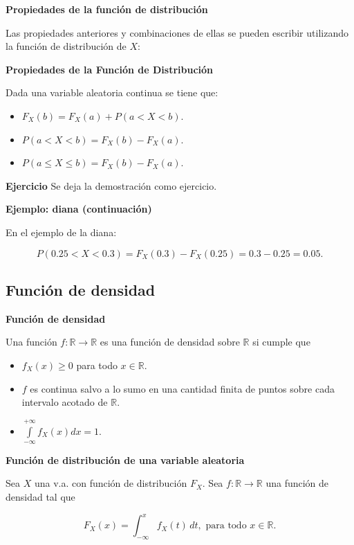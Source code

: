 \documentclass[]{book}
\providecommand{\tightlist}{%
  \setlength{\itemsep}{0pt}\setlength{\parskip}{0pt}}
\begin{document}
\textbf{Propiedades de la función de distribución}

Las propiedades anteriores y combinaciones de ellas se pueden
escribir utilizando la función de distribución de \(X\):

\textbf{Propiedades de la Función de Distribución}

Dada una variable aleatoria continua se tiene que:

\begin{itemize}
\tightlist
\item
  \(F_{X}(b)=F_{X}(a)+P(a<X<b)\).
\item
  \(P(a<X<b)=F_{X}(b)-F_{X}(a)\).
\item
  \(P(a\leq X\leq b)=F_{X}(b)-F_{X}(a)\).
\end{itemize}

\textbf{Ejercicio}
Se deja la demostración como ejercicio.

\textbf{Ejemplo: diana (continuación)}

En el ejemplo de la diana:

\[P(0.25<X<0.3)=F_{X}(0.3)-F_{X}(0.25)=0.3-0.25=0.05.\]

\hypertarget{funciuxf3n-de-densidad}{%
\subsection{Función de densidad}\label{funciuxf3n-de-densidad}}

\textbf{Función de densidad}

Una función \(f:\mathbb{R}\to\mathbb{R}\) es una función de densidad sobre \(\mathbb{R}\) si cumple que

\begin{itemize}
\tightlist
\item
  \(f_{X}(x)\geq 0\) para todo \(x \in\mathbb{R}.\)
\item
  \(f\) es continua salvo a lo sumo en una cantidad finita de puntos sobre
  cada intervalo acotado de \(\mathbb{R}\).
\item
  \(\displaystyle\int\limits_{-\infty}^{+\infty} f_{X}(x) dx=1.\)
\end{itemize}

\textbf{Función de distribución de una variable aleatoria}

Sea \(X\) una v.a. con función de distribución \(F_X\). Sea \(f:\mathbb{R}\to\mathbb{R}\) una función de densidad tal que

\[F_X(x)=\displaystyle\int_{-\infty}^{x} f_X(t)\,dt,\mbox{ para todo } x\in\mathbb{R}.\]
\end{document}
